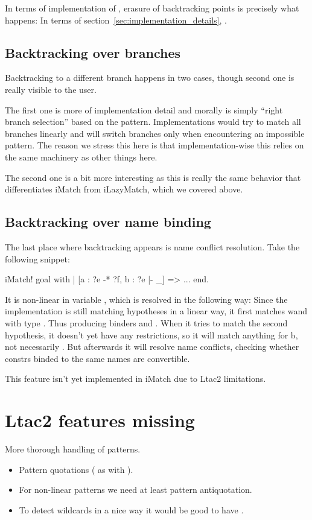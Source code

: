 In terms of implementation of , erasure of backtracking points is precisely what happens:
In terms of section~\ref{sec:implementation_details}, .

\subsection{Backtracking over branches}

Backtracking to a different branch happens in two cases, though second one is really visible to the user.

The first one is more of implementation detail and morally is simply ``right branch selection'' based on the pattern.
Implementations would try to match all branches linearly and will switch branches only when encountering an impossible pattern.
The reason we stress this here is that implementation-wise this relies on the same  machinery as other things here.

The second one is a bit more interesting as this is really the same behavior that differentiates iMatch from iLazyMatch, which we covered above.

\subsection{Backtracking over name binding}

The last place where backtracking appears is name conflict resolution.
Take the following snippet:

\begin{coq}
iMatch! goal with
| [a : ?e -* ?f, b : ?e |- _] => ...
end.
\end{coq}

It is non-linear in variable , which is resolved in the following way:
Since the implementation is still matching hypotheses in a linear way, it first matches wand  with type .
Thus producing binders  and .
When it tries to match the second hypothesis, it doesn't yet have any restrictions, so it will match anything for b, not necessarily .
But afterwards it will resolve name conflicts, checking whether constrs binded to the same names are convertible.

This feature isn't yet implemented in iMatch due to Ltac2 limitations.

\section{Ltac2 features missing}

More thorough handling of patterns.
\begin{itemize}
\item Pattern quotations ( as with ).
\item For non-linear patterns we need at least pattern antiquotation.
\item To detect wildcards in a nice way it would be good to have .
\end{itemize}

